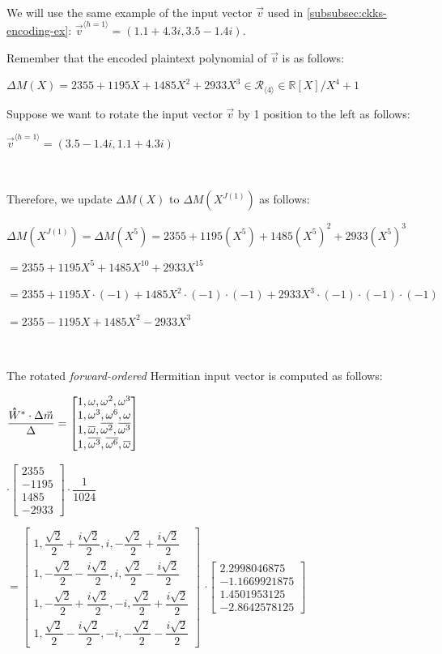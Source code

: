 $ $

We will use the same example of the input vector $\vec{v}$ used in \autoref{subsubsec:ckks-encoding-ex}: $\vec{v}^{\langle h=1 \rangle} = (1.1 + 4.3i, 3.5 - 1.4i)$.

Remember that the encoded plaintext polynomial of $\vec{v}$ is as follows: 

$\Delta M(X) = 2355 + 1195X + 1485X^2 + 2933X^3 \in \mathcal{R}_{\langle 4 \rangle} \in \mathbb{R}[X] / X^4 + 1$


Suppose we want to rotate the input vector $\vec{v}$ by 1 position to the left as follows: 

$\vec{v}^{\langle h=1 \rangle} = (3.5 - 1.4i, 1.1 + 4.3i)$

$ $

Therefore, we update $\Delta M(X)$ to $\Delta M(X^{J(1)})$ as follows:

$\Delta M(X^{J(1)}) = \Delta M(X^{5}) = 2355 + 1195(X^5) + 1485(X^5)^2 + 2933(X^5)^3$ 

$= 2355 + 1195X^5 + 1485X^{10} + 2933X^{15}$

$= 2355 + 1195X\cdot(-1) + 1485X^{2}\cdot(-1)\cdot(-1) + 2933X^{3}\cdot(-1)\cdot(-1)\cdot(-1)$

$= 2355 - 1195X + 1485X^2 - 2933X^3$

$ $

The rotated \textit{forward-ordered} Hermitian input vector is computed as follows:

$\dfrac{\hathat W^* \cdot \Delta \vec{m}}{\Delta} = \begin{bmatrix}
1,\omega,\omega^2, \omega^3\\
1,\omega^3, \omega^6,\omega\\
1,\overline{\omega}, \overline{\omega^2}, \overline{\omega^3}\\
1,\overline{\omega^3}, \overline{\omega^6}, \overline{\omega}
\end{bmatrix}$

$\cdot \begin{bmatrix}
2355\\- 1195\\1485\\-2933
\end{bmatrix}\cdot \dfrac{1}{1024}$

$= 
\begin{bmatrix}
1,\dfrac{\sqrt{2}}{2} + \dfrac{i\sqrt{2}}{2},i, -\dfrac{\sqrt{2}}{2} + \dfrac{i\sqrt{2}}{2}\\
1,-\dfrac{\sqrt{2}}{2} - \dfrac{i\sqrt{2}}{2}, i,\dfrac{\sqrt{2}}{2} - \dfrac{i\sqrt{2}}{2}\\
1,-\dfrac{\sqrt{2}}{2} + \dfrac{i\sqrt{2}}{2}, -i, \dfrac{\sqrt{2}}{2} + \dfrac{i\sqrt{2}}{2}\\
1,\dfrac{\sqrt{2}}{2} - \dfrac{i\sqrt{2}}{2}, -i, -\dfrac{\sqrt{2}}{2} - \dfrac{i\sqrt{2}}{2}
\end{bmatrix}$
$\cdot \begin{bmatrix}
2.2998046875\\-1.1669921875\\1.4501953125\\-2.8642578125
\end{bmatrix}$

